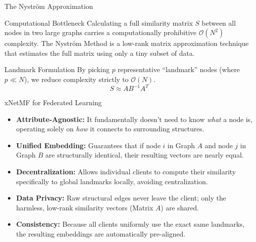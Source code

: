 \documentclass[11pt, aspectratio=169]{beamer}
\begin{document}
\begin{frame}{The Nyström Approximation}
    \begin{block}{Computational Bottleneck}
        Calculating a full similarity matrix $S$ between all nodes in two large graphs carries a computationally prohibitive $\mathcal{O}(N^2)$ complexity. The Nyström Method is a low-rank matrix approximation technique that estimates the full matrix using only a tiny subset of data.
    \end{block}
    
    \vspace{0.3cm}
    \begin{block}{Landmark Formulation}
        By picking $p$ representative ``landmark'' nodes (where $p \ll N$), we reduce complexity strictly to $\mathcal{O}(N)$.
        \begin{equation*}
            S \approx A B^{-1} A^T
        \end{equation*}
    \end{block}
\end{frame}

\begin{frame}{xNetMF for Federated Learning}
    \begin{itemize}
        \item \textbf{Attribute-Agnostic:} It fundamentally doesn't need to know \textit{what} a node is, operating solely on \textit{how} it connects to surrounding structures.
        \item \textbf{Unified Embedding:} Guarantees that if node $i$ in Graph $A$ and node $j$ in Graph $B$ are structurally identical, their resulting vectors are nearly equal.
        \item \textbf{Decentralization:} Allows individual clients to compute their similarity specifically to global landmarks locally, avoiding centralization.
        \item \textbf{Data Privacy:} Raw structural edges never leave the client; only the harmless, low-rank similarity vectors (Matrix $A$) are shared.
        \item \textbf{Consistency:} Because all clients uniformly use the exact same landmarks, the resulting embeddings are automatically pre-aligned.
    \end{itemize}
\end{frame}
\end{document}
